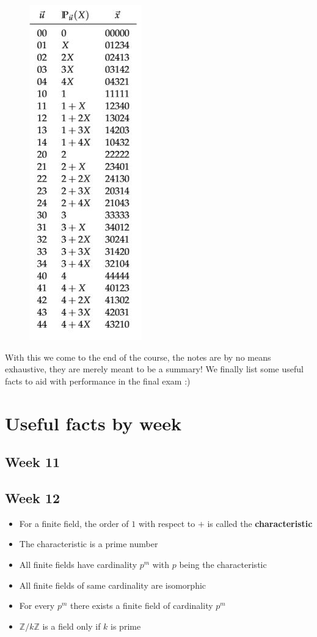 \documentclass[titlepage]{article}
\begin{document}
\begin{figure}[H]
    \centering
    \includegraphics[scale = 0.6]{src/rsfig.JPG}
    \label{fig:my_label}
\end{figure}

With this we come to the end of the course, the notes are by no means exhaustive, they are merely meant to be a summary! We finally list some useful facts to aid with performance in the final exam :)


\section{Useful facts by week}

\subsection{Week 11}


\subsection{Week 12}
\begin{itemize}
    \item For a finite field, the order of $1$ with respect to $+$ is called the \textbf{characteristic}
    \item The characteristic is a prime number
    \item All finite fields have cardinality $p^{m}$ with $p$ being the characteristic
    \item All finite fields of same cardinality are isomorphic
    \item For every $p^{m}$ there exists a finite field of cardinality $p^{m}$
    \item $\mathbb{Z}/k\mathbb{Z}$ is a field only if $k$ is prime
\end{itemize}
\end{document}
